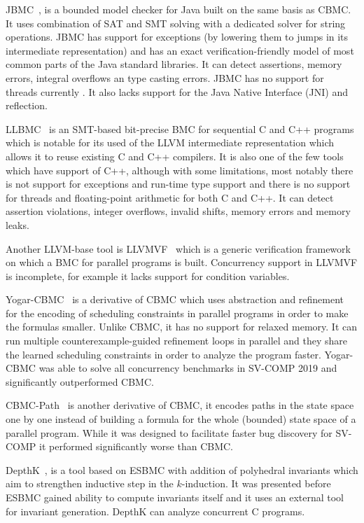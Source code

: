 JBMC~\cite{Cordeiro2019,Cordeiro2018}, is a bounded model checker for
Java built on the same basis as CBMC.
It uses combination of SAT and SMT solving with a dedicated solver for string
operations.
JBMC has support for exceptions (by lowering them to jumps in its intermediate
representation) and has an exact verification-friendly model of most common
parts of the Java standard libraries.
It can detect assertions, memory errors, integral overflows an type casting
errors.
JBMC has no support for threads currently .
It also lacks support for the Java Native Interface (JNI) and reflection.

LLBMC~\cite{Merz2012,Falke2013} is an SMT-based bit-precise BMC for
sequential C and C++ programs which is notable for its used of the LLVM
intermediate representation which allows it to reuse existing C and C++
compilers.
It is also one of the few tools which have support of C++, although with some
limitations, most notably there is not support for exceptions and run-time type
support and there is no support for threads and floating-point arithmetic for
both C and C++.
It can detect assertion violations, integer overflows, invalid shifts, memory
errors and memory leaks.

Another LLVM-base tool is LLVMVF~\cite{Sousa2013} which is a generic verification framework on which a BMC for parallel programs is built.
Concurrency support in LLVMVF is incomplete, for example it lacks support for condition variables.

Yogar-CBMC~\cite{Yin2018,Yin2019} is a derivative of CBMC which uses
abstraction and refinement for the encoding of scheduling constraints in
parallel programs in order to make the formulas smaller.
Unlike CBMC, it has no support for relaxed memory.
It can run multiple counterexample-guided refinement loops in parallel and they
share the learned scheduling constraints in order to analyze the program
faster.
Yogar-CBMC was able to solve all concurrency benchmarks in SV-COMP 2019 and significantly outperformed CBMC.

CBMC-Path~\cite{Khazem2019} is another derivative of CBMC, it encodes paths in
the state space one by one instead of building a formula for the whole
(bounded) state space of a parallel program.
While it was designed to facilitate faster bug discovery for SV-COMP it performed significantly worse than CBMC.

DepthK~\cite{Rocha2017,Rocha2017svc}, is a tool based on ESBMC with
addition of polyhedral invariants which aim to strengthen inductive step in the
$k$-induction.
It was presented before ESBMC gained ability to compute invariants itself and it uses an external tool for invariant generation.
DepthK can analyze concurrent C programs.


